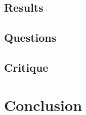 \documentclass{article} %
\begin{document}
\subsection{Results}






\subsection{Questions}







\subsection{Critique}







\section{Conclusion}







\end{document}
